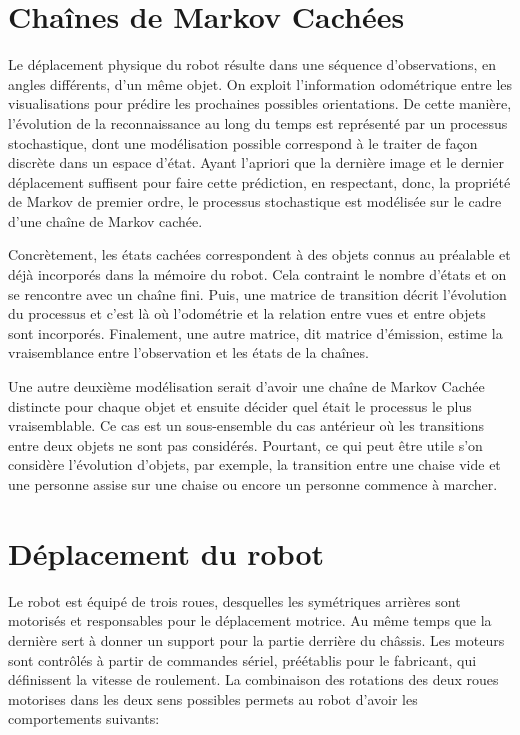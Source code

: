 \section {Chaînes de Markov Cachées}

Le déplacement physique du robot résulte dans une séquence
d'observations, en angles différents, d'un même objet. On exploit
l'information odométrique entre les visualisations pour prédire les
prochaines possibles orientations. De cette manière, l'évolution de la
reconnaissance au long du temps est représenté par un processus
stochastique, dont une modélisation possible correspond à le traiter
de façon discrète dans un espace d'état. Ayant l'apriori que la
dernière image et le dernier déplacement suffisent pour faire cette
prédiction, en respectant, donc, la propriété de Markov de premier
ordre, le processus stochastique est modélisée sur le cadre d'une
chaîne de Markov cachée.

Concrètement, les états cachées correspondent à des objets connus au
préalable et déjà incorporés dans la mémoire du robot. Cela contraint le
nombre d'états et on se rencontre avec un chaîne fini. Puis, une
matrice de transition décrit l'évolution du processus et c'est là où
l'odométrie et la relation entre vues et entre objets sont
incorporés. Finalement, une autre matrice, dit matrice d'émission,
estime la vraisemblance entre l'observation et les états de la
chaînes.

Une autre deuxième modélisation serait d'avoir une chaîne de Markov
Cachée distincte pour chaque objet et ensuite décider quel était le
processus le plus vraisemblable. Ce cas est un sous-ensemble du cas
antérieur où les transitions entre deux objets ne sont pas
considérés. Pourtant, ce qui peut être utile s'on considère
l'évolution d'objets, par exemple, la transition entre une chaise vide
et une personne assise sur une chaise ou encore un personne
commence à marcher.

\section{Déplacement du robot}

Le robot est équipé de trois roues, desquelles les symétriques
arrières sont motorisés et responsables pour le déplacement
motrice. Au même temps que la dernière sert à donner un support pour
la partie derrière du châssis. Les moteurs sont contrôlés à
partir de commandes sériel, préétablis pour le fabricant, qui
définissent la vitesse de roulement. La combinaison des rotations
des deux roues motorises dans les deux sens possibles permets au
robot d'avoir les comportements suivants:

